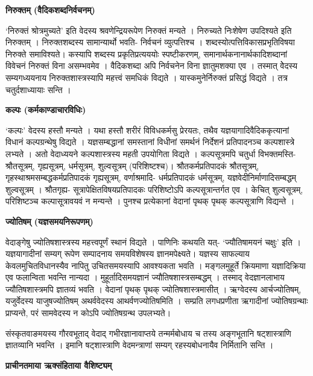 \documentclass[11pt, a5paper]{article}
\newcommand{\customparagraph}[1]{
    \noindent \textbf{#1} \par
    \penalty 10000 %
    \vspace{0.1cm plus 0.05cm minus 0.02cm}
    \penalty 10000 %
}
\begin{document}
\customparagraph{\textbf{निरुक्तम् (वैदिकशब्दनिर्वचनम्)}}

‘निरुक्तं श्रोत्रमुच्यते’ इति वेदस्य श्रवणेन्द्रियरूपेण निरुक्तं मन्यते । निरुच्यते निःशेषेण उपदिश्यते इति निरुक्तम् । निरुक्तशब्दस्य सामान्यार्थो भवति- निर्वचनं व्युत्पत्तिश्च । शब्दस्योत्पत्तिविकासप्रभृतिविषया निरुक्ते समाविश्यते। कस्यापि शब्दस्य प्रकृतिप्रत्यययोः स्पष्टीकरणम्, समानार्थकनानार्थकादिशब्दानां विवेचनं निरुक्तं विना असम्भवमेव । वैदिकशब्दा अपि निर्वचनेन विना ज्ञातुमशक्या एव । तस्मात् वेेदस्य सम्यगध्ययनाय निरुक्तशास्त्रस्यापि महत्त्वं समधिकं विद्यते । यास्कमुनेर्निरुक्तं प्रसिद्धं विद्यते । तत्र चतुर्दशाध्यायाः सन्ति ।

\customparagraph{\textbf{कल्पः (कर्मकाण्डाचारविधिः)}}

‘कल्पः’ वेदस्य हस्तौ मन्यते । यथा हस्तौ शरीरं विविधकर्मसु प्रेरयतः, तथैव यज्ञयागादिवैदिककृत्यानां विधानं कल्पग्रन्थेषु विद्यते । यज्ञसम्बद्धानां समस्तानां विधीनां समर्थनं निर्देशनं प्रतिपादनञ्च कल्पशास्त्रे लभ्यते । अतो वेदाध्ययने कल्पशास्त्रस्य महती उपयोगिता विद्यते । कल्पसूत्रमपि चतुर्धा विभक्तमस्ति- श्रौतसूत्रम्, गृह्यसूत्रम्, धर्मसूत्रम्, शुल्वसूत्रम् (परिशिष्टश्च)। श्रौतकर्मप्रतिपादकं श्रौतसूत्रम्, गृहस्थाश्रमसम्बद्धकर्मप्रतिपादकं गृह्यसूत्रम्, वर्णाश्रमादि- धर्मप्रतिपादकं धर्मसूत्रम्, यज्ञवेदीनिर्माणादिसम्बद्धम् शुल्वसूत्रम् । श्रौतगृह्य- सूत्रापेक्षितविषयप्रतिपादकः परिशिष्टोऽपि कल्पसूत्रान्तर्गत एव । केचित् शुल्वसूत्रम्, परिशिष्टञ्च कल्पासूत्रावयवं न मन्यन्ते । पुनश्च प्रत्येकानां वेदानां पृथक् पृथक्  कल्पसूत्राणि विद्यन्ते ।

\customparagraph{\textbf{ज्योतिषम् (यज्ञसमयनिरूपणम्)}}

वेदाङ्गेषु ज्योतिषशास्त्रस्य महत्त्वपूर्णं स्थानं विद्यते । पाणिनिः कथयति यत्- ‘ज्यौतिषामयनं चक्षुः’ इति । यज्ञयागादीनां सम्यग् रूपेण सम्पादनाय समयविशेषस्य ज्ञानमपेक्ष्यते। यज्ञस्य साफल्याय केवलमुचितविधानस्यैव नापितु उचितसमयस्यापि आवश्यकता भवति । मङ्गलमुहूर्ते क्रियमाणा यज्ञादिक्रिया एव फलान्विता भवन्ति नान्यदा । मुहूर्तादिसमयज्ञानं ज्यौतिषशास्त्रसम्बद्धम् । तस्माद् वेदज्ञानलाभाय ज्यौतिषशास्त्रमपि ज्ञातव्यं भवति । वेदानां पृथक् पृथक् ज्योतिषशास्त्रमासीत् । ऋग्वेदस्य आर्चज्योतिषम्, यजुर्वेदस्य याजुषज्योतिषम् अथर्ववेदस्य आथर्वणज्योतिषमिति । सम्प्रति लगधप्रणीता ऋगादीनां ज्योतिषग्रन्थाः प्राप्यन्ते, परं सामवेदस्य न कोऽपि ज्योतिषग्रन्थ उपलभ्यते।

संस्कृतवाङ‌मयस्य गौरवभूताद् वेदाद् गभीरज्ञानावाप्तये तन्मर्मबोधाय च तस्य अङ्गभूतानि षट्‍शास्त्राणि ज्ञातव्यानि भवन्ति । इमानि षट्‌शास्त्राणि वेदमन्त्राणां सम्यग् रहस्यबोधनायैव निर्मितानि सन्ति ।

\customparagraph{\textbf{प्राचीनतमाया ऋक्संहिताया वैशिष्ट्यम्}}
\end{document}
